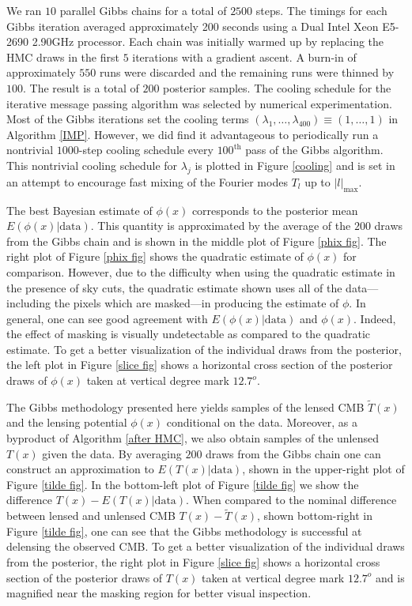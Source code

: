 \documentclass[iop,revtex4,apj,onecolumn]{emulateapj}
\begin{document}
 

We ran $10$ parallel Gibbs chains for a total of $2500$ steps. The timings for each Gibbs iteration averaged approximately 200 seconds using a Dual Intel Xeon E5-2690 2.90GHz processor. Each chain was initially warmed up by replacing the HMC draws in the first $5$ iterations with a gradient ascent. A burn-in of approximately $550$ runs were discarded and the remaining runs were thinned by $100$. The result is a total of $200$ posterior samples. The cooling schedule for the iterative message passing algorithm was selected by numerical experimentation.  Most of the Gibbs iterations set the cooling terms $(\lambda_1,\ldots, \lambda_{400}) \equiv (1,\ldots, 1)$  in Algorithm \ref{IMP}. However, we did find it advantageous to periodically run a nontrivial $1000$-step cooling schedule every $100^\text{th}$ pass of the Gibbs algorithm. This nontrivial cooling schedule for $\lambda_j$ is plotted in Figure \ref{cooling} and is set in an attempt to encourage fast mixing of the Fourier modes $T_l$ up to $|l|_\text{max}$. 



The best Bayesian estimate of $\phi(x)$ corresponds to the posterior mean $E(\phi(x) |\text{data})$. This quantity is approximated by the average of the $200$ draws from the Gibbs chain and is shown in the middle plot of Figure \ref{phix fig}.  The right plot of Figure \ref{phix fig} shows the quadratic estimate of $\phi(x)$ for comparison. However, due to the difficulty when using the quadratic estimate in the presence of sky cuts, the quadratic estimate shown uses all of the data---including the pixels which are masked---in producing the estimate of $\phi$. In general, one can see good agreement with $E(\phi(x) | \text{data})$  and $\phi(x)$. Indeed, the effect of masking is visually undetectable as compared to the quadratic estimate.  To get a better visualization of the individual draws from the posterior, the left plot in Figure \ref{slice fig} shows a horizontal cross section of the posterior draws of $\phi(x)$ taken at vertical degree mark $12.7^o$. 


The Gibbs methodology presented here yields samples of the lensed CMB $\widetilde T(x)$ and the lensing potential $\phi(x)$ conditional on the data. Moreover, as a byproduct of Algorithm \ref{after HMC}, we also obtain samples of the unlensed $T(x)$ given the data. By averaging $200$ draws from the Gibbs chain one can construct an approximation to $E(T(x) | \text{data})$, shown in the upper-right plot of Figure \ref{tilde fig}. In the bottom-left plot of Figure \ref{tilde fig} we show the  difference $T(x) - E(T(x) | \text{data})$.
When compared to the nominal difference between lensed and unlensed CMB $T(x) - \widetilde T(x)$, shown bottom-right in Figure \ref{tilde fig}, one can see that the Gibbs methodology is successful at delensing the observed CMB. To get a better visualization of the individual draws from the posterior, the right plot in Figure \ref{slice fig} shows a horizontal cross section of the posterior draws of $T(x)$ taken at vertical degree mark $12.7^o$ and is magnified near the masking region for better visual inspection.  
\end{document}
